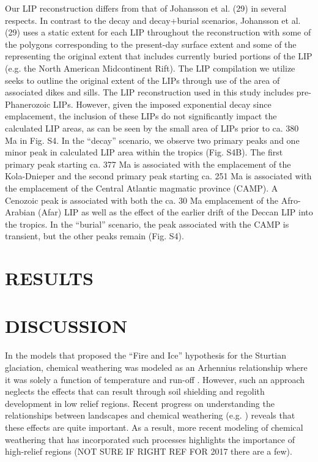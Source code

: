 \documentclass[11pt,letterpaper]{article}
\begin{document}
Our LIP reconstruction differs from that of Johansson et al. (29) in several respects. In contrast to the decay and decay+burial scenarios, Johansson et al. (29) uses a static extent for each LIP throughout the reconstruction with some of the polygons corresponding to the present-day surface extent and some of the representing the original extent that includes currently buried portions of the LIP (e.g. the North American Midcontinent Rift). The LIP compilation we utilize seeks to outline the original extent of the LIPs through use of the area of associated dikes and sills. The LIP reconstruction used in this study includes pre-Phanerozoic LIPs. However, given the imposed exponential decay since emplacement, the inclusion of these LIPs do not significantly impact the calculated LIP areas, as can be seen by the small area of LIPs prior to ca. 380 Ma in Fig. S4.
In the “decay” scenario, we observe two primary peaks and one minor peak in calculated LIP area within the tropics (Fig. S4B). The first primary peak starting ca. 377 Ma is associated with the emplacement of the Kola-Dnieper and the second primary peak starting ca. 251 Ma is associated with the emplacement of the Central Atlantic magmatic province (CAMP). A Cenozoic peak is associated with both the ca. 30 Ma emplacement of the Afro-Arabian (Afar) LIP as well as the effect of the earlier drift of the Deccan LIP into the tropics. In the “burial” scenario, the peak associated with the CAMP is transient, but the other peaks remain (Fig. S4).

\section*{RESULTS}

\section*{DISCUSSION}

In the models that proposed the ``Fire and Ice'' hypothesis for the Sturtian glaciation, chemical weathering was modeled as an Arhennius relationship where it was solely a function of temperature and run-off \citep{Donnadieu2004a}. However, such an approach neglects the effects that can result through soil shielding and regolith development in low relief regions. Recent progress on understanding the relationships between landscapes and chemical weathering (e.g. \cite{Maher2014a}) reveals that these effects are quite important. As a result, more recent modeling of chemical weathering that has incorporated such processes highlights the importance of high-relief regions \citep{Godderis2017a} (NOT SURE IF RIGHT REF FOR 2017 there are a few).
\end{document}
